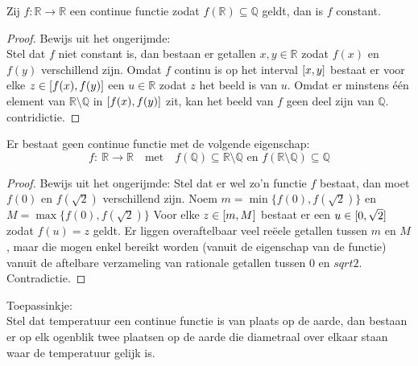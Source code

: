 \documentclass[main.tex]{subfiles}
\begin{document}
\begin{st}
  Zij $f: \mathbb{R} \rightarrow \mathbb{R}$ een continue functie zodat $f(\mathbb{R}) \subseteq \mathbb{Q}$ geldt, dan is $f$ constant.

  \begin{proof}
    Bewijs uit het ongerijmde:\\
    Stel dat $f$ niet constant is, dan bestaan er getallen $x,y \in \mathbb{R}$ zodat $f(x)$ en $f(y)$ verschillend zijn.
    Omdat $f$ continu is op het interval $\interval{x}{y}$ bestaat er voor elke $z \in \interval{f(x)}{f(y)}$ een $u\in \mathbb{R}$ zodat $z$ het beeld is van $u$.
    Omdat er minstens \'e\'en element van $\mathbb{R} \setminus \mathbb{Q}$ in $\interval{f(x)}{f(y)}$ zit\needed, kan het beeld van $f$ geen deel zijn van $\mathbb{Q}$.
    contridictie.
  \end{proof}
\feed
\end{st}

\begin{tvb}
  Er bestaat geen continue functie met de volgende eigenschap:
  \[
  f:\ \mathbb{R} \rightarrow \mathbb{R} \quad\text{met}\quad f(\mathbb{Q}) \subseteq \mathbb{R} \setminus \mathbb{Q} \text{ en } f(\mathbb{R} \setminus \mathbb{Q}) \subseteq \mathbb{Q}
  \]

  \begin{proof}
    Bewijs uit het ongerijmde:
    Stel dat er wel zo'n functie $f$ bestaat, dan moet $f(0)$ en $f(\sqrt{2})$ verschillend zijn.
    Noem $m=\min\{f(0),f(\sqrt{2})\}$ en $M= \max\{f(0),f(\sqrt{2})\}$
    Voor elke $z \in \interval{m}{M}$ bestaat er een $u \in \interval{0}{\sqrt{2}}$ zodat $f(u) = z$ geldt.
    Er liggen overaftelbaar veel re\"eele getallen tussen $m$ en $M$, maar die mogen enkel bereikt worden (vanuit de eigenschap van de functie) vanuit de aftelbare verzameling van rationale getallen tussen $0$ en $sqrt{2}$.
    Contradictie.
  \end{proof}
\feed
\end{tvb}

\begin{st}
  Toepassinkje:\\
  Stel dat temperatuur een continue functie is van plaats op de aarde, dan bestaan er op elk ogenblik twee plaatsen op de aarde die diametraal over elkaar staan waar de temperatuur gelijk is.
\end{st}
\end{document}
